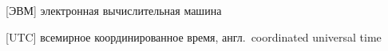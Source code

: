 \renewcommand*{\aclabelfont}[1]{\acsfont{#1}} %

\newcommand{\abbstart}{} %

\newcommand{\abbdash}{\acroextra{\hspace{-0.5mm}--} } %

\newcommand{\abbendl}{\acroextra{;}} %

\begin{acronym}[\hspace{-0.2cm}] %
[\abbstart ЭВМ]{\abbdash электронная вычислительная машина\abbendl}

\vspace{5mm}

[\abbstart UTC]{\abbdash всемирное координированное время, англ.~coordinated universal time\abbendl}
\end{acronym}
